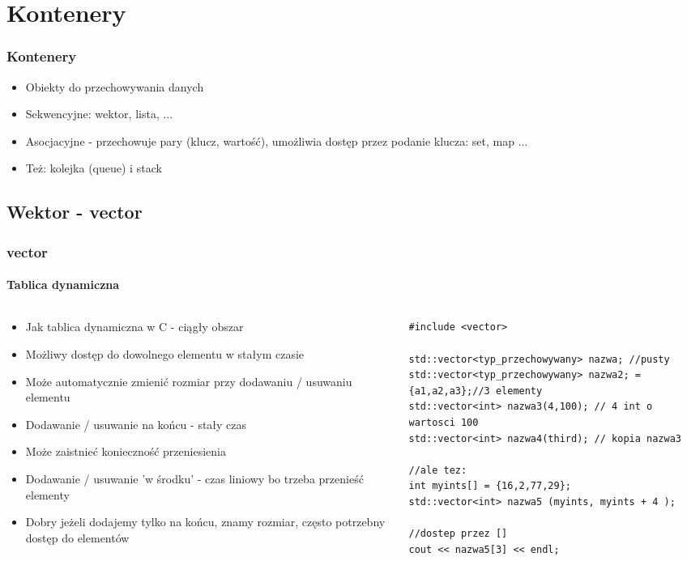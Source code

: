 \documentclass[10pt]{beamer}
\begin{document}
\section{Kontenery}

\begin{frame}
  \frametitle{Kontenery}
  \begin{itemize}
    \item Obiekty do przechowywania danych
    \item Sekwencyjne: wektor, lista, ...
    \item Asocjacyjne - przechowuje pary (klucz, wartość), umożliwia dostęp przez podanie klucza:
    set, map ...
    \item Też: kolejka (queue) i stack
  \end{itemize}
\end{frame}

\subsection{Wektor - vector}

\begin{frame}[fragile]
  \frametitle{vector}
  \framesubtitle{Tablica dynamiczna}
  \begin{columns}
    \begin{column}{0.6\textwidth}
    \begin{itemize}
      \item Jak tablica dynamiczna w C - ciągły obszar
      \item Możliwy dostęp do dowolnego elementu w stałym czasie
      \item Może automatycznie zmienić rozmiar przy dodawaniu / usuwaniu elementu
      \item Dodawanie / usuwanie na końcu - stały czas
      \item Może zaistnieć konieczność przeniesienia
      \item Dodawanie / usuwanie 'w środku' - czas liniowy bo trzeba przenieść elementy
      \item Dobry jeżeli dodajemy tylko na końcu, znamy rozmiar, często potrzebny dostęp do elementów
    \end{itemize}
    \end{column}
    \begin{column}{0.47\textwidth}
\begin{lstlisting}
#include <vector>

std::vector<typ_przechowywany> nazwa; //pusty
std::vector<typ_przechowywany> nazwa2; = {a1,a2,a3};//3 elementy
std::vector<int> nazwa3(4,100); // 4 int o wartosci 100
std::vector<int> nazwa4(third); // kopia nazwa3

//ale tez:
int myints[] = {16,2,77,29};
std::vector<int> nazwa5 (myints, myints + 4 );

//dostep przez []
cout << nazwa5[3] << endl;
\end{lstlisting}
    \end{column}
  \end{columns}
\end{frame}
\end{document}
